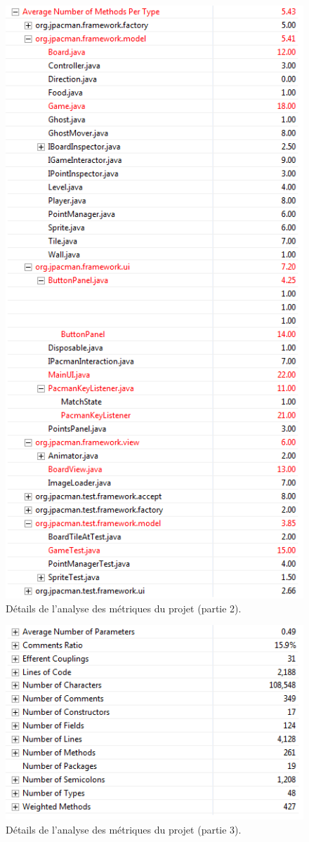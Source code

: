 \documentclass[12pt,a4paper,final]{article}
\begin{document}
\begin{figure}[!h]
	\centering
	\includegraphics[height=\textheight]{Metrique1.png}
	\caption{\label{métrique1}Détails de l'analyse des métriques du projet (partie 2).}
\end{figure}
\begin{figure}[!h]
	\centering
	\includegraphics{Metrique2.png}
	\caption{\label{métrique2}Détails de l'analyse des métriques du projet (partie 3).}
\end{figure}
\end{document}

